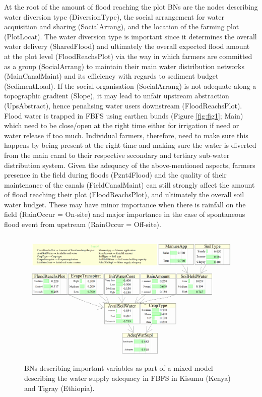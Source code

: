 \documentclass[12pt,oneside]{article}
\begin{document}
At the root of the amount of flood reaching the plot BNs are the nodes describing water diversion type (DiversionType), the social arrangement for water acquisition and sharing (SocialArrang), and the location of the farming plot (PlotLocat). The water diversion type is important since it determines the overall water delivery (SharedFlood) and ultimately the overall expected flood amount at the plot level (FloodReachsPlot) via the way in which farmers are committed as a group (SocialArrang) to maintain their main water distribution networks (MainCanalMaint) and its efficiency with regards to sediment budget (SedimentLoad). If the social organisation (SocialArrang) is not adequate along a topographic gradient (Slope), it may lead to unfair upstream abstraction (UpsAbstract), hence penalising water users downstream (FloodReachsPlot). Flood water is trapped in FBFS using earthen bunds (Figure \ref{fig:fig1}; Main) which need to be close/open at the right time either for irrigation if need or water release if too much. Individual farmers, therefore, need to make sure this happens by being present at the right time and making sure the water is diverted from the main canal to their respective secondary and tertiary sub-water distribution system. Given the adequacy of the above-mentioned aspects, farmers presence in the field during floods (Pznt4Flood) and the quality of their maintenance of the canals (FieldCanalMaint) can still strongly affect the amount of flood reaching their plot (FloodReachsPlot), and ultimately the overall soil water budget. These may have minor importance when there is rainfall on the field (RainOccur = On-site) and major importance in the case of spontaneous flood event from upstream (RainOccur = Off-site).

\begin{figure}[!htbp]

{\centering \includegraphics[width=1\linewidth,]{figures/Modelling_FBFS_Suppl_Water_Supply_Adequacy_BNs_plot} 

}

\caption{BNs describing important variables as part of a mixed model describing the water supply adequacy in FBFS in Kisumu (Kenya) and Tigray (Ethiopia).}\label{fig:fig3}
\end{figure}
\end{document}
